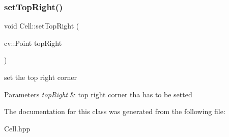 \subsubsection{\texorpdfstring{set\+Top\+Right()}{setTopRight()}}
{\footnotesize\ttfamily void Cell\+::set\+Top\+Right (\begin{DoxyParamCaption}\item[{cv\+::\+Point}]{top\+Right }\end{DoxyParamCaption})}

set the top right corner 
\begin{DoxyParams}{Parameters}
{\em top\+Right} & top right corner tha has to be setted \\
\hline
\end{DoxyParams}


The documentation for this class was generated from the following file\+:\begin{DoxyCompactItemize}
\item 
Cell.\+hpp\end{DoxyCompactItemize}
